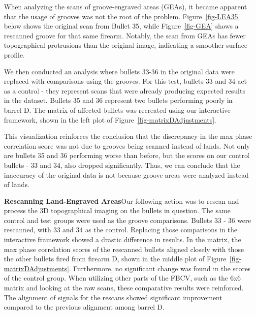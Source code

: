 \documentclass[
  12pt]{article}
\begin{document}
When analyzing the scans of groove-engraved areas (GEAs), it became
apparent that the usage of grooves was not the root of the problem.
Figure~\ref{fig-LEA35} below shows the original scan from Bullet 35,
while Figure~\ref{fig-GEA} shows a rescanned groove for that same
firearm. Notably, the scan from GEAs has fewer topographical protrusions
than the original image, indicating a smoother surface profile.

We then conducted an analysis where bullets 33-36 in the original data
were replaced with comparisons using the grooves. For this test, bullets
33 and 34 act as a control - they represent scans that were already
producing expected results in the dataset. Bullets 35 and 36 represent
two bullets performing poorly in barrel D. The matrix of affected
bullets was recreated using our interactive framework, shown in the left
plot of Figure~\ref{fig-matrixDAdjustments}.

This visualization reinforces the conclusion that the discrepancy in the
max phase correlation score was not due to grooves being scanned instead
of lands. Not only are bullets 35 and 36 performing worse than before,
but the scores on our control bullets - 33 and 34, also dropped
significantly. Thus, we can conclude that the inaccuracy of the original
data is not because groove areas were analyzed instead of lands.

\hfill\newline\noindent \textbf{Rescanning Land-Engraved
Areas}\hfill\newline Our following action was to rescan and process the
3D topographical imaging on the bullets in question. The same control
and test groups were used as the groove comparisons. Bullets 33 - 36
were rescanned, with 33 and 34 as the control. Replacing those
comparisons in the interactive framework showed a drastic difference in
results. In the matrix, the max phase correlation scores of the
rescanned bullets aligned closely with those the other bullets fired
from firearm D, shown in the middle plot of
Figure~\ref{fig-matrixDAdjustments}. Furthermore, no significant change
was found in the scores of the control group. When utilizing other parts
of the FBCV, such as the 6x6 matrix and looking at the raw scans, these
comparative results were reinforced. The alignment of signals for the
rescans showed significant improvement compared to the previous
alignment among barrel D.
\end{document}
